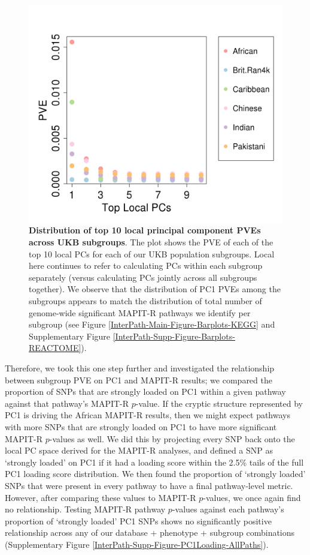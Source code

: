 \documentclass[12pt,a4paper]{article}
\begin{document}
\begin{figure}[htb]
\centering
\includegraphics[scale=.45]{Images/Main/InterPath_Main_Figure_Eigenvalues_vs2.png}
\caption[TBD]{\textbf{Distribution of top 10 local principal component PVEs across UKB subgroups}. The plot shows the PVE of each of the top 10 local PCs for each of our UKB population subgroups. Local here continues to refer to calculating PCs within each subgroup separately (versus calculating PCs jointly across all subgroups together). We observe that the distribution of PC1 PVEs among the subgroups appears to match the distribution of total number of genome-wide significant MAPIT-R pathways we identify per subgroup (see Figure \ref{InterPath-Main-Figure-Barplots-KEGG} and  Supplementary Figure \ref{InterPath-Supp-Figure-Barplots-REACTOME}).}
\label{InterPath-Main-Figure-Eigenvalues}
\end{figure}

Therefore, we took this one step further and investigated the relationship between subgroup PVE on PC1 and MAPIT-R results; we compared the proportion of SNPs that are strongly loaded on PC1 within a given pathway against that pathway's MAPIT-R $p$-value. If the cryptic structure represented by PC1 is driving the African MAPIT-R results, then we might expect pathways with more SNPs that are strongly loaded on PC1 to have more significant MAPIT-R $p$-values as well. We did this by projecting every SNP back onto the local PC space derived for the MAPIT-R analyses, and defined a SNP as `strongly loaded' on PC1 if it had a loading score within the 2.5\% tails of the full PC1 loading score distribution. We then found the proportion of `strongly loaded' SNPs that were present in every pathway to have a final pathway-level metric. However, after comparing these values to MAPIT-R $p$-values, we once again find no relationship. Testing MAPIT-R pathway $p$-values against each pathway's proportion of `strongly loaded' PC1 SNPs shows no significantly positive relationship across any of our database + phenotype + subgroup combinations (Supplementary Figure \ref{InterPath-Supp-Figure-PC1Loading-AllPaths}). 
\end{document}
